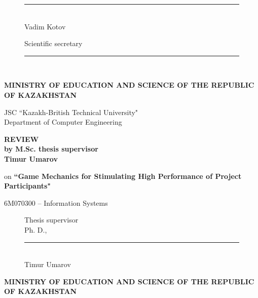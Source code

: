 \begin{titlepage}
\begin{figure}[ht]
\begin{minipage}[t]{0.5\linewidth}
				\rule{13em}{0.4pt}\\
				Vadim Kotov\\
			\end{minipage}
			\begin{minipage}[t]{0.5\linewidth}
				Scientific secretary\\

				\rule{13em}{0.4pt}\\
			\end{minipage}
		\end{figure}
		
		\pagebreak

	\begin{centering}
		{\bf{\MakeUppercase{Ministry of education and science of the republic of Kazakhstan}}

		\vspace{14pt}

		JSC ``Kazakh-British Technical University"\\
		Department of Computer Engineering}
       \vspace{14pt}

		{\bf
		\MakeUppercase{Review}\\
		by M.Sc. thesis supervisor\\
		Timur Umarov
		}

		\vspace{14pt}
		
		on 	{\bf``Game Mechanics for Stimulating High Performance of Project Participants"}
		
		\vspace{14pt}
		
		6M070300 -- Information Systems

	\end{centering}
    
    

		\begin{figure}[ht]
			\begin{minipage}[t]{0.5\linewidth}
				Thesis supervisor\\
				Ph. D.,

				\rule{13em}{0.4pt}\\
				Timur Umarov\\
			\end{minipage}
		\end{figure}
		
		\pagebreak

	\begin{centering}
		{\bf{\MakeUppercase{Ministry of education and science of the republic of Kazakhstan}}}


\end{centering}
\end{titlepage}
